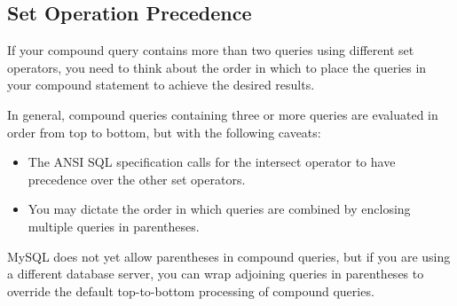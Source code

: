 \subsection{Set Operation Precedence}
If your compound query contains more than two queries using different set operators, you need to think about the order in which to place the queries in your compound statement to achieve the desired results.

In general, compound queries containing three or more queries are evaluated in order from top to bottom, but with the following caveats:

\begin{itemize}
    \item  The ANSI SQL specification calls for the intersect operator to have precedence over the other set operators.
    \item You may dictate the order in which queries are combined by enclosing multiple queries in parentheses.
\end{itemize}

MySQL does not yet allow parentheses in compound queries, but if you are using a different database server, you can wrap adjoining queries in parentheses to override the default top-to-bottom processing of compound queries.

